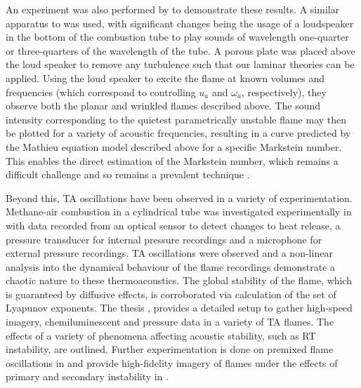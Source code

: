 An experiment was also performed by \cite{searby1991ParametricAcousticInstability} to demonstrate these results. A similar apparatus to  was used, with significant changes being the usage of a loudspeaker in the bottom of the combustion tube to play sounds of wavelength one-quarter or three-quarters of the wavelength of the tube. A porous plate was placed above the loud speaker to remove any turbulence such that our laminar theories can be applied. Using the loud speaker to excite the flame at known volumes and frequencies (which correspond to controlling $u_a$ and $ω_a$, respectively), they observe both the planar and wrinkled flames described above. The sound intensity corresponding to the quietest parametrically unstable flame may then be plotted for a variety of acoustic frequencies, resulting in a curve predicted by the Mathieu equation model described above for a specific Markstein number. This enables the direct estimation of the Markstein number, which remains a difficult challenge and so remains a prevalent technique \cite{delfin2024ThermoacousticParametricInstability}.

Beyond this, TA oscillations have been observed in a variety of experimentation. Methane-air combustion in a cylindrical tube was investigated experimentally in \cite{fichera2001ExperimentalAnalysisThermoacoustic} with data recorded from an optical sensor to detect changes to heat release, a pressure transducer for internal pressure recordings and a microphone for external pressure recordings. TA oscillations were observed and a non-linear analysis into the dynamical behaviour of the flame recordings demonstrate a chaotic nature to these thermoacoustics. The global stability of the flame, which is guaranteed by diffusive effects, is corroborated via calculation of the set of Lyapunov exponents. The thesis \cite{ebieto2017DynamicsPremixedFlames}, provides a detailed setup to gather high-speed imagery, chemiluminescent and pressure data in a variety of TA flames. The effects of a variety of phenomena affecting acoustic stability, such as RT instability, are outlined. Further experimentation is done on premixed flame oscillations in \cite{delfin2024VideoTransientParametric,martinez-ruiz2018VideoPremixedflameOscillations,delfin2024ThermoacousticParametricInstability} and provide high-fidelity imagery of flames under the effects of primary and secondary instability in \cite{delfin2024VideoTransientParametric,martinez-ruiz2018VideoPremixedflameOscillations}.





